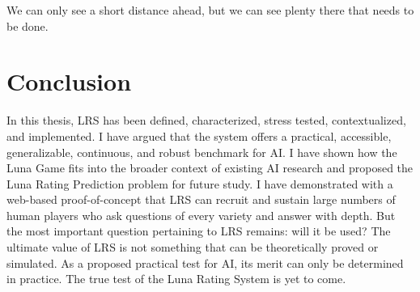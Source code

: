 \begin{savequote}[75mm]
We can only see a short distance ahead, but we can see plenty there that needs to be done.
\end{savequote}

\chapter{Conclusion}

In this thesis, LRS has been defined, characterized, stress tested, contextualized, and implemented. I have argued that the system offers a practical, accessible, generalizable, continuous, and robust benchmark for AI. I have shown how the Luna Game fits into the broader context of existing AI research and proposed the Luna Rating Prediction problem for future study. I have demonstrated with a web-based proof-of-concept that LRS can recruit and sustain large numbers of human players who ask questions of every variety and answer with depth. But the most important question pertaining to LRS remains: will it be used? The ultimate value of LRS is not something that can be theoretically proved or simulated. As a proposed practical test for AI, its merit can only be determined in practice. The true test of the Luna Rating System is yet to come. 
